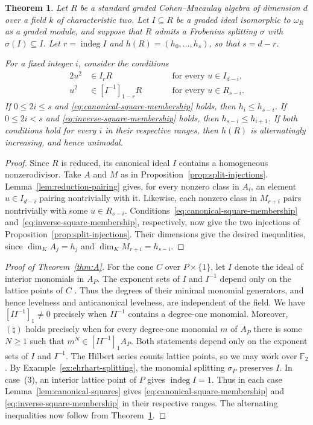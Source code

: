 \documentclass[a4paper,11pt]{amsart}
\DeclareMathOperator{\indeg}{indeg}
\newcommand{\kk}{k}
\newcommand{\natur}{\natural}
\newtheorem{theorem}{Theorem}[section]
\theoremstyle{definition}
\begin{document}
\begin{theorem}\label{thm:split-canonical}
Let $R$ be a standard graded Cohen--Macaulay algebra of dimension $d$ over a field $\kk$ of characteristic two. Let $I\subseteq R$ be a graded ideal isomorphic to $\omega_R$ as a graded module, and suppose that $R$ admits a Frobenius splitting $\sigma$ with $\sigma(I)\subseteq I$. Let $r=\indeg I$ and $h(R)=(h_0,\ldots,h_s)$, so that $s=d-r$.

For a fixed integer $i$, consider the conditions
\begin{alignat}{2}
 u^2&\in I_rR &&\qquad\text{for every }u\in I_{d-i},\label{eq:canonical-square-membership}\\
 u^2&\in [I^{-1}]_{1-r}R &&\qquad\text{for every }u\in R_{s-i}.\label{eq:inverse-square-membership}
\end{alignat}
If $0\leq 2i\leq s$ and \eqref{eq:canonical-square-membership} holds, then $h_i\leq h_{s-i}$. If $0\leq 2i<s$ and \eqref{eq:inverse-square-membership} holds, then $h_{s-i}\leq h_{i+1}$. If both conditions hold for every $i$ in their respective ranges, then $h(R)$ is alternatingly increasing, and hence unimodal.
\end{theorem}
\begin{proof}
Since $R$ is reduced, its canonical ideal $I$ contains a homogeneous nonzerodivisor. Take $A$ and $M$ as in Proposition~\ref{prop:split-injections}. Lemma~\ref{lem:reduction-pairing} gives, for every nonzero class in $A_i$, an element $u\in I_{d-i}$ pairing nontrivially with it. Likewise, each nonzero class in $M_{r+i}$ pairs nontrivially with some $u\in R_{s-i}$. Conditions~\eqref{eq:canonical-square-membership} and~\eqref{eq:inverse-square-membership}, respectively, now give the two injections of Proposition~\ref{prop:split-injections}. Their dimensions give the desired inequalities, since $\dim_K A_j=h_j$ and $\dim_K M_{r+i}=h_{s-i}$.
\end{proof}

\begin{proof}[Proof of Theorem~\ref{thm:A}]
For the cone $C$ over $P\times\{1\}$, let $I$ denote the ideal of interior monomials in $A_P$. The exponent sets of $I$ and $I^{-1}$ depend only on the lattice points of $C$ \cite[Proposition~4.1 and Corollary~4.2]{HMP19}. Thus the degrees of their minimal monomial generators, and hence levelness and anticanonical levelness, are independent of the field. We have $[II^{-1}]_1\neq0$ precisely when $II^{-1}$ contains a degree-one monomial. Moreover, $(\natur)$ holds precisely when for every degree-one monomial $m$ of $A_P$ there is some $N\geq1$ such that $m^N\in[II^{-1}]_1A_P$. Both statements depend only on the exponent sets of $I$ and $I^{-1}$. The Hilbert series counts lattice points, so we may work over $\mathbb F_2$. By Example~\ref{ex:ehrhart-splitting}, the monomial splitting $\sigma_P$ preserves $I$. In case~\textup{(3)}, an interior lattice point of $P$ gives $\indeg I=1$. Thus in each case Lemma~\ref{lem:canonical-squares} gives \eqref{eq:canonical-square-membership} and \eqref{eq:inverse-square-membership} in their respective ranges. The alternating inequalities now follow from Theorem~\ref{thm:split-canonical}.
\end{proof}
\end{document}
